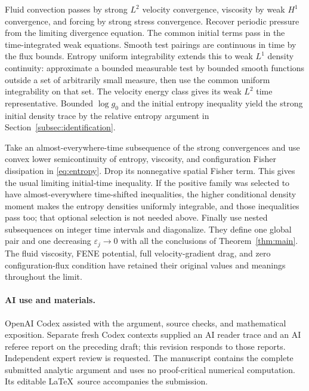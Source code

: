 \documentclass[11pt]{article}
\numberwithin{equation}{section}
\begin{document}
Fluid convection passes by strong $L^2$ velocity convergence, viscosity by
weak $H^1$ convergence, and forcing by strong stress convergence. Recover
periodic pressure from the limiting divergence equation. The common initial
terms pass in the time-integrated weak equations. Smooth test pairings are
continuous in time by the flux bounds. Entropy uniform integrability extends
this to weak $L^1$ density continuity: approximate a bounded measurable test
by bounded smooth functions outside a set of arbitrarily small measure, then
use the common uniform integrability on that set. The velocity energy class
gives its weak $L^2$ time representative. Bounded $\log g_0$ and the initial
entropy inequality yield the strong initial density trace by the relative
entropy argument in Section~\ref{subsec:identification}.

Take an almost-everywhere-time subsequence of the strong convergences and use
convex lower semicontinuity of entropy, viscosity, and configuration Fisher
dissipation in \eqref{eq:entropy}. Drop its nonnegative spatial Fisher term.
This gives the usual limiting initial-time inequality. If the positive family
was selected to have almost-everywhere time-shifted inequalities, the higher
conditional density moment makes the entropy densities uniformly integrable,
and those inequalities pass too; that optional selection is not needed above.
Finally use nested subsequences on integer time intervals and diagonalize.
They define one global pair and one decreasing $\varepsilon_j\to0$ with all
the conclusions of Theorem~\ref{thm:main}. The fluid viscosity, FENE potential,
full velocity-gradient drag, and zero configuration-flux condition have
retained their original values and meanings throughout the limit.

\paragraph{AI use and materials.}
OpenAI Codex assisted with the argument, source checks, and mathematical
exposition. Separate fresh Codex contexts supplied an AI reader trace and an
AI referee report on the preceding draft; this revision responds to those
reports. Independent expert review is requested. The manuscript contains the
complete submitted analytic argument and uses no proof-critical numerical
computation. Its editable \LaTeX\ source accompanies the submission.
\end{document}
